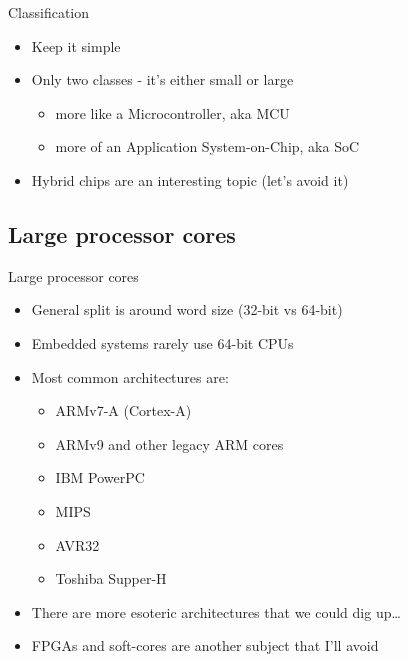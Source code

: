 \documentclass{beamer}
\begin{document}
\begin{frame}{Classification}


\begin{itemize}
  \item Keep it simple
  \item Only two classes - it's either small or large
  \begin{itemize}
    \item[Small] more like a Microcontroller, aka MCU
    \item[Large] more of an Application System-on-Chip, aka SoC
  \end{itemize}
  \item Hybrid chips are an interesting topic (let's avoid it)
\end{itemize}

\end{frame}

\subsection{Large processor cores}

\begin{frame}{Large processor cores}
\begin{itemize}
  \item General split is around word size (32-bit vs 64-bit)
  \item Embedded systems rarely use 64-bit CPUs
  \item Most common architectures are:
  \begin{itemize}
    \item ARMv7-A (Cortex-A)
    \item ARMv9 and other legacy ARM cores
    \item IBM PowerPC
    \item MIPS
    \item AVR32
    \item Toshiba Supper-H
  \end{itemize}
  \item There are more esoteric architectures that we could dig up\dots
  \item FPGAs and soft-cores are another subject that I'll avoid \frownie
\end{itemize}
\end{frame}
\end{document}
